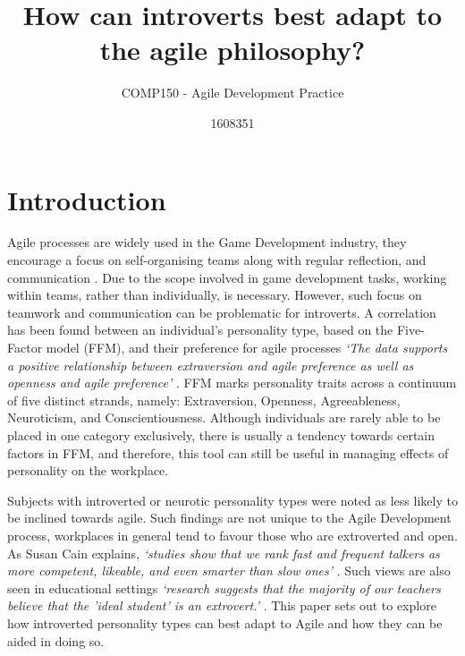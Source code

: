 \documentclass{scrartcl}
\title{How can introverts best adapt to the agile philosophy?}
\subtitle{COMP150 - Agile Development Practice}
\author{1608351}
\begin{document}
\maketitle


\section{Introduction}

Agile processes are widely used in the Game Development industry, they encourage a focus on self-organising teams along with regular reflection, and communication \cite{Agile}. Due to the scope involved in game development tasks, working within teams, rather than individually, is necessary. However, such focus on teamwork and communication can be problematic for introverts. A correlation has been found between an individual's personality type, based on the Five-Factor model (FFM), and their preference for agile processes \textit{`The data supports a positive relationship between extraversion and agile preference as well as openness and agile preference'} \cite{BishopDeokar}. FFM marks personality traits across a continuum of five distinct strands, namely: Extraversion, Openness, Agreeableness, Neuroticism, and Conscientiousness. Although individuals are rarely able to be placed in one category exclusively, there is usually a tendency towards certain factors in FFM, and therefore, this tool can still be useful in managing effects of personality on the workplace.

Subjects with introverted or neurotic personality types were noted as less likely to be inclined towards agile. Such findings are not unique to the Agile Development process, workplaces in general tend to favour those who are extroverted and open. As Susan Cain explains, \textit{`studies show that we rank fast and frequent talkers as more competent, likeable, and even smarter than slow ones' }\cite{Cain}. Such views are also seen in educational settings \textit{`research suggests that the majority of our teachers believe that the 'ideal student' is an extrovert.'} \cite{Cain}. This paper sets out to explore how introverted personality types can best adapt to Agile and how they can be aided in doing so.
\end{document}

